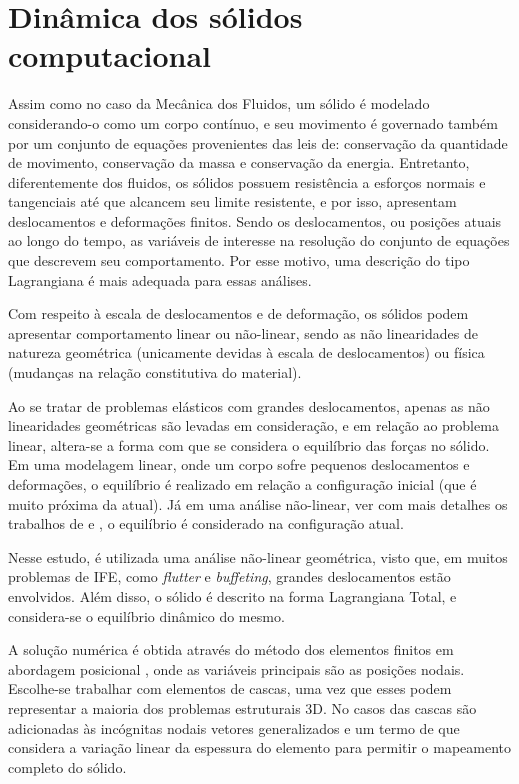 \documentclass[tese_patricia]{subfiles}
\begin{document}
\chapter[Dinâmica dos sólidos computacional]{Dinâmica dos sólidos computacional} \label{capitulo:Cap4}

Assim como no caso da Mecânica dos Fluidos, um sólido é modelado considerando-o como um corpo contínuo, e seu movimento é governado também por um conjunto de equações provenientes das leis de: conservação da quantidade de movimento, conservação da massa e conservação da energia. Entretanto, diferentemente dos fluidos, os sólidos possuem resistência a esforços normais e tangenciais até que alcancem seu limite resistente, e por isso, apresentam deslocamentos e deformações finitos. Sendo os deslocamentos, ou posições atuais ao longo do tempo, as variáveis de interesse na resolução do conjunto de equações que descrevem seu comportamento. Por esse motivo, uma descrição do tipo Lagrangiana é mais adequada para essas análises.

Com respeito à escala de deslocamentos e de deformação, os sólidos podem apresentar comportamento linear ou não-linear, sendo as não linearidades de natureza geométrica (unicamente devidas à escala de deslocamentos) ou física (mudanças na relação constitutiva do material). 

Ao se tratar de problemas elásticos com grandes deslocamentos, apenas as não linearidades geométricas são levadas em consideração, e em relação ao problema linear, altera-se a forma com que se considera o equilíbrio das forças no sólido. Em uma modelagem linear, onde um corpo sofre pequenos deslocamentos e deformações, o equilíbrio é realizado em relação a configuração inicial (que é muito próxima da atual). Já em uma análise não-linear, ver com mais detalhes os trabalhos de  e , o equilíbrio é considerado na configuração atual.

Nesse estudo, é utilizada uma análise não-linear geométrica, visto que, em muitos problemas de IFE, como \textit{flutter} e \textit{buffeting}, grandes deslocamentos estão envolvidos. Além disso, o sólido é descrito na forma Lagrangiana Total, e considera-se o equilíbrio dinâmico do mesmo. 

A solução numérica é obtida através do método dos elementos finitos em abordagem posicional \cite{Coda:2003,Coda:2018}, onde as variáveis principais são as posições nodais. Escolhe-se trabalhar com elementos de cascas, uma vez que esses podem representar a maioria dos problemas estruturais 3D. No casos das cascas são adicionadas às incógnitas nodais vetores generalizados e um termo de que considera a variação linear da espessura do elemento para permitir o mapeamento completo do sólido. 
\end{document}
